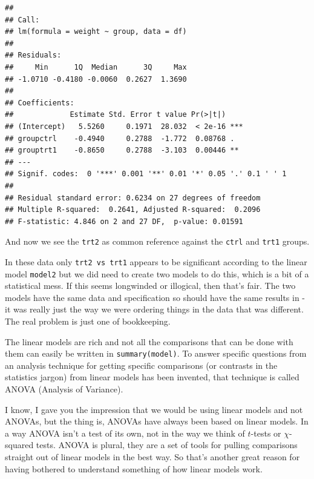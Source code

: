 \documentclass[
]{book}
\newenvironment{Shaded}{\begin{snugshade}}{\end{snugshade}}
\newcommand{\DataTypeTok}[1]{\textcolor[rgb]{0.13,0.29,0.53}{#1}}
\newcommand{\KeywordTok}[1]{\textcolor[rgb]{0.13,0.29,0.53}{\textbf{#1}}}
\newcommand{\NormalTok}[1]{#1}
\newcommand{\OperatorTok}[1]{\textcolor[rgb]{0.81,0.36,0.00}{\textbf{#1}}}
\newcommand{\StringTok}[1]{\textcolor[rgb]{0.31,0.60,0.02}{#1}}
\newenvironment{sidenote}
{ \begin{tcolorbox}[colbacktitle=blue!50!white,
title=huh?,coltitle=white,
fonttitle=\bfseries] }
{  \end{tcolorbox} }
\begin{document}
\begin{Shaded}
\end{Shaded}

\begin{verbatim}
## 
## Call:
## lm(formula = weight ~ group, data = df)
## 
## Residuals:
##     Min      1Q  Median      3Q     Max 
## -1.0710 -0.4180 -0.0060  0.2627  1.3690 
## 
## Coefficients:
##             Estimate Std. Error t value Pr(>|t|)    
## (Intercept)   5.5260     0.1971  28.032  < 2e-16 ***
## groupctrl    -0.4940     0.2788  -1.772  0.08768 .  
## grouptrt1    -0.8650     0.2788  -3.103  0.00446 ** 
## ---
## Signif. codes:  0 '***' 0.001 '**' 0.01 '*' 0.05 '.' 0.1 ' ' 1
## 
## Residual standard error: 0.6234 on 27 degrees of freedom
## Multiple R-squared:  0.2641,	Adjusted R-squared:  0.2096 
## F-statistic: 4.846 on 2 and 27 DF,  p-value: 0.01591
\end{verbatim}

And now we see the \texttt{trt2} as common reference against the \texttt{ctrl} and \texttt{trt1} groups.

In these data only \texttt{trt2\ vs\ trt1} appears to be significant according to the linear model \texttt{model2} but we did need to create two models to do this, which is a bit of a statistical mess. If this seems longwinded or illogical, then that's fair. The two models have the same data and specification so should have the same results in - it was really just the way we were ordering things in the data that was different. The real problem is just one of bookkeeping.

The linear models are rich and not all the comparisons that can be done with them can easily be written in \texttt{summary(model)}. To answer specific questions from an analysis technique for getting specific comparisons (or contrasts in the statistics jargon) from linear models has been invented, that technique is called ANOVA (Analysis of Variance).

\begin{sidenote}
I know, I gave you the impression that we would be using linear models and not ANOVAs, but the thing is, ANOVAs have always been based on linear models. In a way ANOVA isn't a test of its own, not in the way we think of \(t\)-tests or \(\chi\)-squared tests. ANOVA is plural, they are a set of tools for pulling comparisons straight out of linear models in the best way. So that's another great reason for having bothered to understand something of how linear models work.
\end{sidenote}
\end{document}
